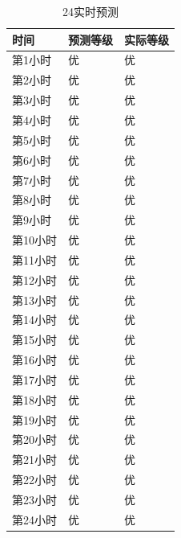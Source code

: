 \documentclass[UTF8]{ctexart}
\begin{document}
\begin{table}[H]
    \centering
    \begin{tabular}{|l|l|l|}
        \hline
        时间    & 预测等级 & 实际等级 \\ \hline
        第1小时  & 优    & 优    \\ \hline
        第2小时  & 优    & 优    \\ \hline
        第3小时  & 优    & 优    \\ \hline
        第4小时  & 优    & 优    \\ \hline
        第5小时  & 优    & 优    \\ \hline
        第6小时  & 优    & 优    \\ \hline
        第7小时  & 优    & 优    \\ \hline
        第8小时  & 优    & 优    \\ \hline
        第9小时  & 优    & 优    \\ \hline
        第10小时 & 优    & 优    \\ \hline
        第11小时 & 优    & 优    \\ \hline
        第12小时 & 优    & 优    \\ \hline
        第13小时 & 优    & 优    \\ \hline
        第14小时 & 优    & 优    \\ \hline
        第15小时 & 优    & 优    \\ \hline
        第16小时 & 优    & 优    \\ \hline
        第17小时 & 优    & 优    \\ \hline
        第18小时 & 优    & 优    \\ \hline
        第19小时 & 优    & 优    \\ \hline
        第20小时 & 优    & 优    \\ \hline
        第21小时 & 优    & 优    \\ \hline
        第22小时 & 优    & 优    \\ \hline
        第23小时 & 优    & 优    \\ \hline
        第24小时 & 优    & 优    \\ \hline
        \end{tabular}
    \caption{24实时预测}
    \label{allhours24}
\end{table}
\end{document}
